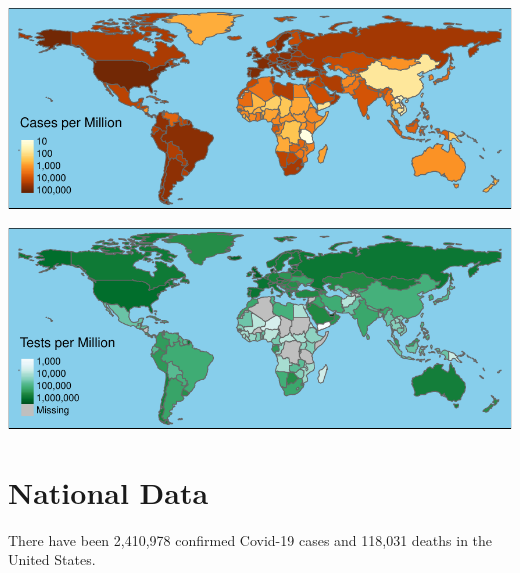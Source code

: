 \documentclass[]{article}
\begin{document}
\includegraphics{covid_files/figure-latex/unnamed-chunk-5-1.pdf}

\includegraphics{covid_files/figure-latex/unnamed-chunk-6-1.pdf}

\newpage

\hypertarget{national-data}{%
\section{National Data}\label{national-data}}

There have been 2,410,978 confirmed Covid-19 cases and 118,031 deaths in
the United States.
\end{document}
